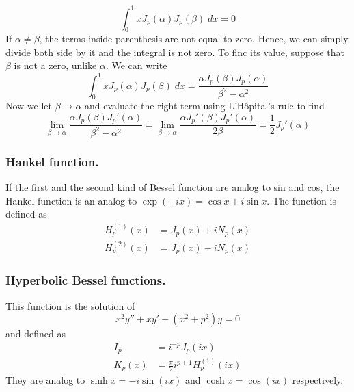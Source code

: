 \documentclass[../main.tex]{subfiles}
\begin{document}
\begin{equation*}
    \int_{0}^{1}xJ_p(\alpha)J_p(\beta)\;dx=0
\end{equation*}
If $\alpha\neq\beta$, the terms inside parenthesis are not equal to zero. Hence, we can simply divide both side by it and the integral is not zero. To finc its value, suppose that $\beta$ is not a zero, unlike $\alpha$. We can write 
\begin{equation*}
    \int_{0}^{1}xJ_p(\alpha)J_p(\beta)\;dx=\frac{\alpha J_p(\beta)J_p(\alpha)}{\beta^2-\alpha^2}
\end{equation*}
Now we let $\beta\rightarrow\alpha$ and evaluate the right term using  L'Hôpital's rule to find 
\begin{equation*}
    \lim_{\beta\rightarrow\alpha}\frac{\alpha J_p(\beta)J_p'(\alpha)}{\beta^2-\alpha^2} =\lim_{\beta\rightarrow\alpha}\frac{\alpha J_p'(\beta)J_p'(\alpha)}{2\beta}=\frac{1}{2}J_p'(\alpha)
\end{equation*}


\subsubsection*{Hankel function.} If the first and the second kind of Bessel function are analog to sin and cos, the Hankel function is an analog to $\exp(\pm ix)=\cos x \pm i\sin x$. The function is defined as  
\begin{align*}
    H_p^{(1)}(x)&=J_p(x)+iN_p(x)\\
    H_p^{(2)}(x)&=J_p(x)-iN_p(x)
\end{align*}

\subsubsection*{Hyperbolic Bessel functions.} This function is the solution of 
\begin{equation*}
    x^2y''+xy'-(x^2+p^2)y=0
\end{equation*}
and defined as 
\begin{align*}
    I_p&=i^{-p}J_p(ix)\\
    K_p(x)&=\frac{\pi}{2}i^{p+1}H_p^{(1)}(ix)
\end{align*}
They are analog to $\sinh x= -i\sin (ix)$ and $\cosh x=\cos (ix)$ respectively.
\end{document}
